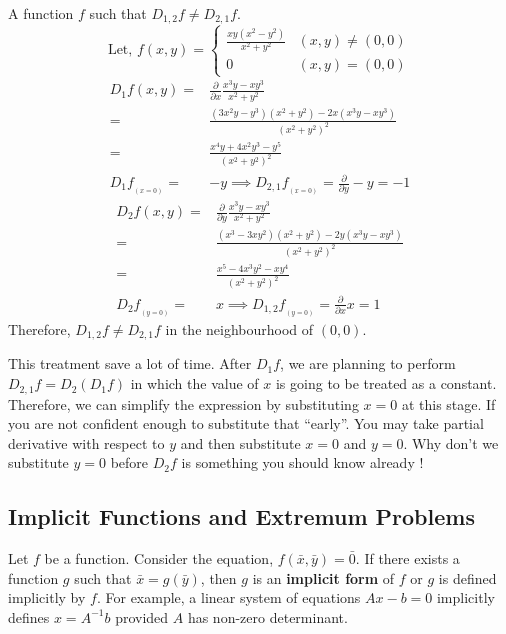\begin{remark} A function $f$ such that $D_{1,2} f \ne D_{2,1} f$.
\[ \text{Let, }f(x,y) = \begin{cases} \frac{xy(x^2-y^2)}{x^2+y^2} & (x,y) \ne (0,0) \\ 0 & (x,y) = (0,0) \end{cases} \]
\begin{align*}
	D_1 f(x,y) = & \frac{\partial}{\partial x} \frac{x^3y-xy^3}{x^2+y^2} \\
	= & \frac{(3x^2y-y^3)(x^2+y^2) - 2x(x^3y-xy^3)}{(x^2+y^2)^2} \\
	= & \frac{x^4y+4x^2y^3-y^5}{(x^2+y^2)^2}\\
	D_1 f_{_{(x = 0)}} = & -y \implies D_{2,1} f_{_{(x = 0)}} = \frac{\partial}{\partial y} -y = -1
\end{align*}
\begin{align*}
	D_2 f(x,y) = & \frac{\partial}{\partial y} \frac{x^3y-xy^3}{x^2+y^2} \\
	= & \frac{(x^3-3xy^2)(x^2+y^2)-2y(x^3y-xy^3)}{(x^2+y^2)^2} \\
	= & \frac{x^5-4x^3y^2-xy^4}{(x^2+y^2)^2} \\
	D_2 f_{_{(y = 0)}} = & x \implies D_{1,2} f_{_{(y = 0)}}  = \frac{\partial}{\partial x} x = 1
\end{align*}
Therefore, $D_{1,2} f \ne D_{2,1} f$ in the neighbourhood of $(0,0)$.
\begin{commentary} This treatment save a lot of time.
After $D_1 f$, we are planning to perform $D_{2,1} f = D_2 (D_1 f)$ in which the value of $x$ is going to be treated as a constant.
Therefore, we can simplify the expression by substituting $x = 0$ at this stage.
If you are not confident enough to substitute that ``early''.
You may take partial derivative with respect to $y$ and then substitute $x = 0$ and $y = 0$.
Why don't we substitute $y = 0$ before $D_2 f$ is something you should know already !\end{commentary}
\end{remark}

\subsection{Implicit Functions and Extremum Problems}
\begin{definition}
	Let $f$ be a function.
	Consider the equation, $f(\bar{x},\bar{y}) = \bar{0}$.
	If there exists a function $g$ such that $\bar{x} = g(\bar{y})$, then $g$ is an \textbf{implicit form} of $f$ or $g$ is defined implicitly by $f$.
	For example, a linear system of equations $Ax-b = 0$ implicitly defines $x = A^{-1}b$ provided $ A$ has non-zero determinant.
\end{definition}

